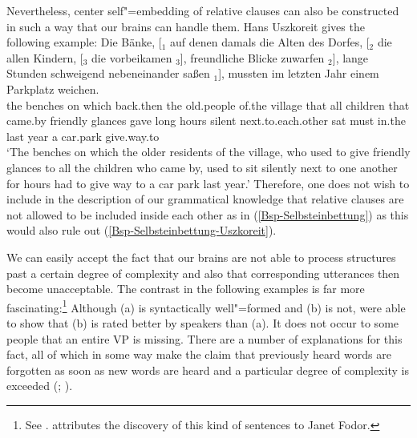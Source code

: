 Nevertheless, center self"=embedding of relative clauses can also be constructed in such a way that our brains can handle them. Hans
Uszkoreit gives the following example:
\ea
\label{Bsp-Selbsteinbettung-Uszkoreit}
\gll Die Bänke, [$_1$ auf denen damals die Alten des Dorfes, [$_2$ die allen Kindern, [$_3$ die vorbeikamen $_3$], freundliche Blicke zuwarfen $_2$], 
lange Stunden schweigend nebeneinander saßen $_1$], mussten im letzten Jahr einem Parkplatz weichen.\\
the benches {} on which back.then the old.people of.the village {} that all children {} that came.by {} friendly glances gave {}
long hours silent next.to.each.other sat {} must in.the last year a car.park give.way.to\\
\glt `The benches on which the older residents of the village, who used to give friendly glances to all the children who came by, used to sit silently next to one 
another for hours had to give way to a car park last year.'
\z
Therefore, one does not wish to include in the description of our grammatical knowledge that
relative clauses are not allowed to be included inside each other as in (\ref{Bsp-Selbsteinbettung})  
as this would also rule out (\ref{Bsp-Selbsteinbettung-Uszkoreit}).

We can easily accept the fact that our brains are not able to process structures past a certain degree of complexity and also that corresponding utterances then become unacceptable.
The contrast in the following examples is far more fascinating:\footnote{
See . \citet[]{Frazier85a-u} 
attributes the discovery of this kind of sentences to Janet Fodor.
}
\eal
{}
\zl
Although (a)  is syntactically well"=formed and (b) is not, \citet{GT99a} were able to
show that (b) is rated better by speakers than (a). It does not occur to some people that an entire
VP is missing. There are a number of explanations for this fact, all of which in
some way make the claim that previously heard words are forgotten as soon as new words are heard and
a particular degree of complexity is exceeded (\citealp[]{Frazier85a-u}; \citealp{GT99a}). 

